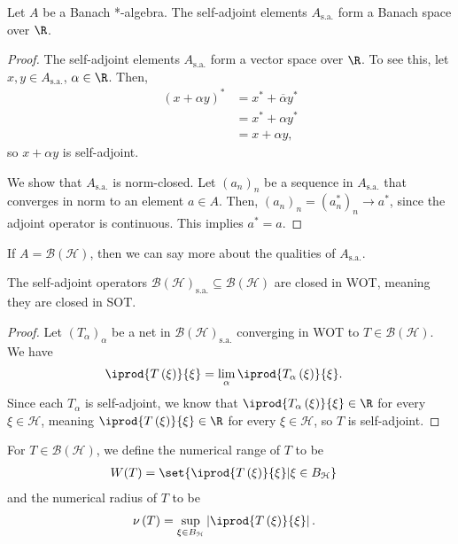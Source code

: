 \documentclass[10pt]{mypackage}
\newcommand{\sa}{\text{s.a.}}
\begin{document}
\begin{proposition}
  Let $A$ be a Banach *-algebra. The self-adjoint elements $A_{\sa}$ form a Banach space over $\R$.
\end{proposition}
\begin{proof}
  The self-adjoint elements $A_{\sa}$ form a vector space over $\R$. To see this, let $x,y\in A_{\sa}$, $\alpha\in \R$. Then,
  \begin{align*}
    \left(x + \alpha y\right)^{\ast} &= x^{\ast} + \overline{\alpha}y^{\ast}\\
                                     &= x^{\ast} + \alpha y^{\ast}\\
                                     &= x + \alpha y,
  \end{align*}
  so $x + \alpha y$ is self-adjoint.\newline

  We show that $A_{\sa}$ is norm-closed. Let $\left(a_n\right)_n$ be a sequence in $A_{\sa}$ that converges in norm to an element $a\in A$. Then, $\left(a_n\right)_n = \left(a_n^{\ast}\right)_n\rightarrow a^{\ast}$, since the adjoint operator is continuous. This implies $a^{\ast} = a$.
\end{proof}
If $A = \mathcal{B}\left(\mathcal{H}\right)$, then we can say more about the qualities of $A_{\sa}$.
\begin{proposition}
  The self-adjoint operators $\mathcal{B}\left(\mathcal{H}\right)_{\sa}\subseteq \mathcal{B}\left(\mathcal{H}\right)$ are closed in WOT, meaning they are closed in SOT.
\end{proposition}
\begin{proof}
  Let $\left(T_{\alpha}\right)_{\alpha}$ be a net in $\mathcal{B}\left(\mathcal{H}\right)_{\sa}$ converging in WOT to $T\in \mathcal{B}\left(\mathcal{H}\right)$. We have
  \begin{align*}
    \iprod{T\left(\xi\right)}{\xi} &= \lim_{\alpha} \iprod{T_{\alpha}\left(\xi\right)}{\xi}.
  \end{align*}
  Since each $T_{\alpha}$ is self-adjoint, we know that $ \iprod{T_{\alpha}\left(\xi\right)}{\xi}\in \R$ for every $\xi\in \mathcal{H}$, meaning $ \iprod{T\left(\xi\right)}{\xi}\in \R $ for every $\xi\in \mathcal{H}$, so $T$ is self-adjoint.
\end{proof}
\begin{definition}
  For $T\in \mathcal{B}\left(\mathcal{H}\right)$, we define the numerical range of $T$ to be
  \begin{align*}
    W(T) &= \set{ \iprod{T\left(\xi\right)}{\xi} | \xi\in B_{\mathcal{H}} }
  \end{align*}
  and the numerical radius of $T$ to be
  \begin{align*}
    \nu\left(T\right) &= \sup_{\xi \in B_{\mathcal{H}}} \left\vert \iprod{T\left(\xi\right)}{\xi} \right\vert.
  \end{align*}
\end{definition}
\end{document}
